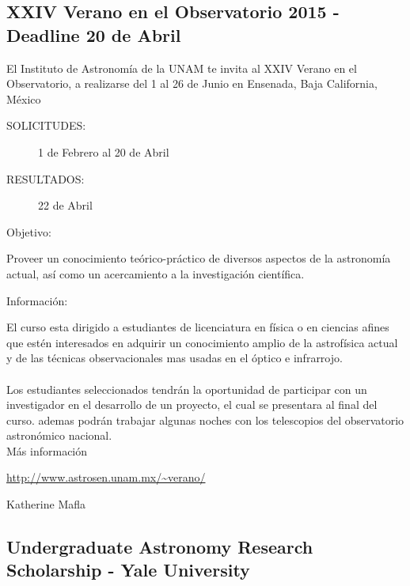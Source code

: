 \documentclass{book}
\begin{document}
\subsection{XXIV Verano en el Observatorio 2015 - Deadline 20 de Abril}
El Instituto de Astronomía de la UNAM te invita al XXIV Verano en el Observatorio, a realizarse del 1 al 26 de Junio en Ensenada, Baja California, México

\begin{description}
\item[SOLICITUDES:] 1 de Febrero al 20 de Abril

\item[RESULTADOS:] 22 de Abril

\item[Objetivo:]
\end{description}
Proveer un conocimiento teórico-práctico de diversos aspectos de la astronomía actual, así como un acercamiento a la investigación científica.
\begin{description}
\item[Información:]
\end{description}
El curso esta dirigido a estudiantes de licenciatura en física o en ciencias afines que estén interesados en adquirir un conocimiento amplio de la astrofísica actual y de las técnicas observacionales mas usadas en el óptico e infrarrojo.\\
\\
Los estudiantes seleccionados tendrán la oportunidad de participar con un investigador en el desarrollo de un proyecto, el cual se presentara al final del curso. ademas podrán trabajar algunas noches con los telescopios del observatorio astronómico nacional.\\

Más información 
\begin{center}
\url{http://www.astrosen.unam.mx/~verano/}
\end{center}
\begin{flushright}
Katherine Mafla
\end{flushright}

\subsection{Undergraduate Astronomy Research Scholarship - Yale University}
\end{document}
